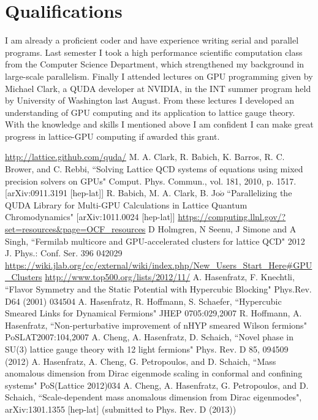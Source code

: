\documentclass[11pt]{article}
\begin{document}
  \section*{Qualifications} %
  I am already a proficient coder and have experience writing serial and parallel programs.
  Last semester I took a high performance scientific computation class from the Computer Science Department, which strengthened my background in large-scale parallelism.
  Finally I attended lectures on GPU programming given by Michael Clark, a QUDA developer at NVIDIA, in the INT summer program held by University of Washington last August.
  From these lectures I developed an understanding of GPU computing and its application to lattice gauge theory.
  With the knowledge and skills I mentioned above I am confident I can make great progress in lattice-GPU computing if awarded this grant.
  \pagebreak

%
\begin{thebibliography}{99}
\url{http://lattice.github.com/quda/}
M. A. Clark, R. Babich, K. Barros, R. C. Brower, and C. Rebbi,
``Solving Lattice QCD systems of equations using mixed precision solvers on GPUs" Comput. Phys. Commun., vol. 181, 2010, p. 1517. [arXiv:0911.3191
[hep-lat]]
R. Babich, M. A. Clark, B. Jo$\acute{o}$ ``Parallelizing the QUDA Library for Multi-GPU Calculations in Lattice Quantum Chromodynamics" [arXiv:1011.0024
[hep-lat]]
\url{https://computing.llnl.gov/?set=resources&page=OCF_resources}
D Holmgren, N Seenu, J Simone and A Singh, ``Fermilab multicore and GPU-accelerated clusters for lattice QCD" 2012 J. Phys.: Conf. Ser. 396 042029
\url{https://wiki.jlab.org/cc/external/wiki/index.php/New_Users_Start_Here#GPU_Clusters}
\url{http://www.top500.org/lists/2012/11/}
A. Hasenfratz, F. Knechtli, ``Flavor Symmetry and the Static Potential with Hypercubic Blocking" Phys.Rev. D64 (2001) 034504
A. Hasenfratz, R. Hoffmann, S. Schaefer, ``Hypercubic Smeared Links for Dynamical Fermions" JHEP 0705:029,2007
R. Hoffmann, A. Hasenfratz, ``Non-perturbative improvement of nHYP smeared Wilson fermions" PoSLAT2007:104,2007
A. Cheng, A. Hasenfratz, D. Schaich, ``Novel phase in SU(3) lattice gauge theory with 12 light fermions" Phys. Rev. D 85, 094509 (2012) 
A. Hasenfratz, A. Cheng, G. Petropoulos, and D. Schaich, ``Mass anomalous dimension from Dirac eigenmode scaling in conformal and confining systems" PoS(Lattice 2012)034
A. Cheng, A. Hasenfratz, G. Petropoulos, and D. Schaich, ``Scale-dependent mass anomalous dimension from Dirac eigenmodes",  arXiv:1301.1355 [hep-lat] (submitted to Phys. Rev. D (2013))

\end{thebibliography}
\end{document}
